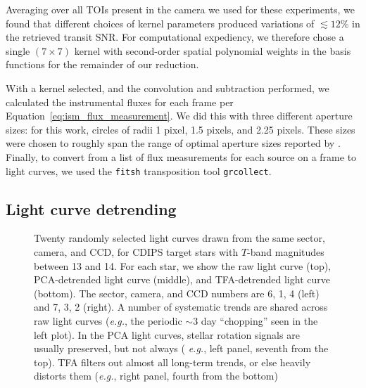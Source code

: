 \documentclass[12pt,twocolumn,tighten]{aastex62}
\begin{document}
Averaging over all TOIs present in the camera we used for these
experiments, we found that different choices of kernel parameters
produced variations of $\lesssim 12\%$ in the retrieved transit SNR.
For computational expediency, we therefore chose a single $(7\times
7)$ kernel with second-order spatial polynomial weights in the basis
functions for the remainder of our reduction.

With a kernel selected, and the convolution and subtraction performed,
we calculated the instrumental fluxes for each frame per
Equation~\ref{eq:ism_flux_measurement}.  We did this with three
different aperture sizes: for this work, circles of radii 1 pixel, 1.5
pixels, and 2.25 pixels.  These sizes were chosen to roughly span the
range of optimal aperture sizes reported by
\citet{Sullivan_et_al_2015}.  Finally, to convert from a list of flux
measurements for each source on a frame to light curves, we used the
\texttt{fitsh} transposition tool \texttt{grcollect}.

\subsection{Light curve detrending}
\label{subsec:lcdetrending}

\begin{figure}[!t]
	\vspace{-0.85cm}
	\caption{
    Twenty randomly selected light curves drawn from the same sector,
    camera, and CCD, for CDIPS target stars with $T$-band magnitudes
    between 13 and 14.  For each star, we show the raw light curve
    (top), PCA-detrended light curve (middle), and TFA-detrended light
    curve (bottom).  The sector, camera, and CCD numbers are 6, 1, 4
    (left) and 7, 3, 2 (right).  A number of systematic trends are
    shared across raw light curves ({\it e.g.}, the periodic $\sim$3 day
    ``chopping'' seen in the left plot).  In the PCA light curves,
    stellar rotation signals are usually preserved, but not always ({\it
    e.g.}, left panel, seventh from the top).  TFA filters out almost
    all long-term trends, or else heavily distorts them ({\it e.g.},
    right panel, fourth from the bottom)
	\label{fig:lc_systematics_dtr}
	}
\end{figure}
\end{document}

